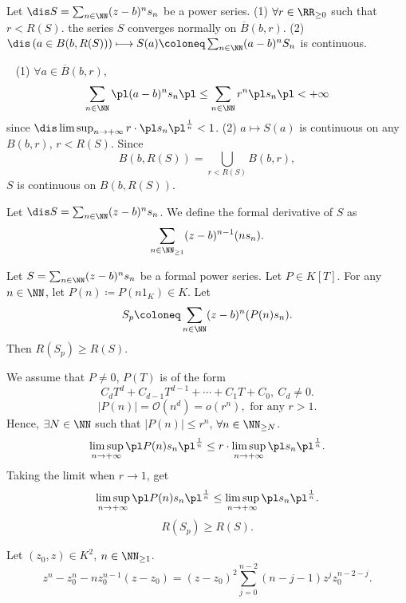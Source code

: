 \begin{propositionenv}
    Let $\dis S=\sum_{n\in\NN} (z-b)^ns_n$ be a power series.
    \newline
    (1) $\forall r\in \RR_{\ge 0}$ such that $r<R(S)$. the series $S$ converges normally on $\overline{B}(b,r)$. 
    \newline
    (2) $\dis \left(a\in B(b,R(S))\right)\longmapsto S(a)\coloneq \sum_{n\in\NN}(a-b)^nS_n$ is continuous.
\end{propositionenv}
\begin{proofenv}
    \ \newline
    (1) $\forall a\in \overline{B}(b,r)$,
    $$ \sum_{n\in\NN}\pl (a-b)^n s_n \pl \le \sum_{n\in\NN} r^n \pl s_n\pl <+\infty$$
    since $\dis \limsup_{n\rightarrow +\infty} r\cdot \pl s_n\pl^{\frac{1}{n}}<1$.
    \newline
    (2) $a\longmapsto S(a)$ is continuous on any $B(b,r)$, $r<R(S)$. Since 
    $$B(b,R(S))=\bigcup_{r<R(S)}B(b,r),$$
    $S$ is continuous on $B(b,R(S))$.
\end{proofenv}
\begin{definitionenv}
    Let $\dis S=\sum_{n\in\NN}(z-b)^ns_n$. We define the formal derivative of $S$ as 
    $$ \sum_{n\in \NN_{\ge 1}}(z-b)^{n-1}(ns_{n}).$$
\end{definitionenv}
\begin{propositionenv}
    Let $S=\sum_{n\in\NN}(z-b)^ns_n$ be a formal power series. Let $P\in K[T]$. For any $n\in\NN$, let $P(n)\coloneq P(n 1_K)\in K$.
    Let 
    $$ S_p\coloneq \sum_{n\in\NN}(z-b)^n(P(n)s_n).$$
    Then $R(S_p)\ge R(S)$.
\end{propositionenv}
\begin{proofenv}
    We assume that $P\neq 0$, $P(T)$ is of the form
    $$ C_dT^d+C_{d-1}T^{d-1}+\cdots+C_1T+C_0, \ C_d\neq 0.$$
    $$|P(n)|=\mathcal{O}(n^d)=o(r^n), \text{ for any }r>1.$$
    Hence, $\exists N\in\NN$ such that $|P(n)|\le r^n$, $\forall n\in \NN_{\ge N}$.
    $$\limsup_{n\rightarrow+\infty}\pl P(n)s_n\pl^{\frac{1}{n}}\le r\cdot\limsup_{n\rightarrow+\infty}\pl s_n\pl^{\frac{1}{n}}.$$
    Taking the limit when $r\rightarrow 1$, get
    $$ \limsup_{n\rightarrow+\infty}\pl P(n)s_n\pl^{\frac{1}{n}}\le \limsup_{n\rightarrow+\infty}\pl s_n\pl^{\frac{1}{n}}.$$
    $$ R(S_p)\ge R(S).$$
\end{proofenv}
\begin{lemmaenv}
    Let $(z_0,z)\in K^2$, $n\in\NN_{\ge 1}$.
    $$ z^n -z_0^n-n z_0^{n-1}(z-z_0)=(z-z_0)^2 \sum_{j=0}^{n-2}(n-j-1)z^j z_0^{n-2-j}.$$
\end{lemmaenv}
